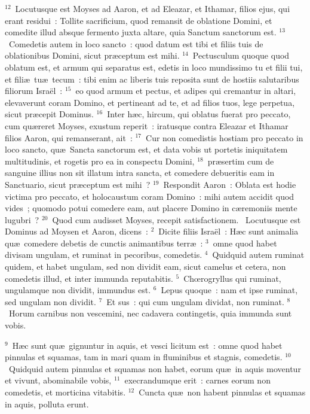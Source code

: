 ${}^{12}$~Locutusque est Moyses ad Aaron, et ad Eleazar, et Ithamar, filios ejus, qui erant residui~: Tollite sacrificium, quod remansit de oblatione Domini, et comedite illud absque fermento juxta altare, quia Sanctum sanctorum est.
${}^{13}$~Comedetis autem in loco sancto~: quod datum est tibi et filiis tuis de oblationibus Domini, sicut pr\ae ceptum est mihi.
${}^{14}$~Pectusculum quoque quod oblatum est, et armum qui separatus est, edetis in loco mundissimo tu et filii tui, et fili\ae\ tu\ae\ tecum~: tibi enim ac liberis tuis reposita sunt de hostiis salutaribus filiorum Isra\"el~:
${}^{15}$~eo quod armum et pectus, et adipes qui cremantur in altari, elevaverunt coram Domino, et pertineant ad te, et ad filios tuos, lege perpetua, sicut pr\ae cepit Dominus.
${}^{16}$~Inter h\ae c, hircum, qui oblatus fuerat pro peccato, cum qu\ae reret Moyses, exustum reperit~: iratusque contra Eleazar et Ithamar filios Aaron, qui remanserant, ait~:
${}^{17}$~Cur non comedistis hostiam pro peccato in loco sancto, qu\ae\ Sancta sanctorum est, et data vobis ut portetis iniquitatem multitudinis, et rogetis pro ea in conspectu Domini,
${}^{18}$~pr\ae sertim cum de sanguine illius non sit illatum intra sancta, et comedere debueritis eam in Sanctuario, sicut pr\ae ceptum est mihi~?
${}^{19}$~Respondit Aaron~: Oblata est hodie victima pro peccato, et holocaustum coram Domino~: mihi autem accidit quod vides~; quomodo potui comedere eam, aut placere Domino in c\ae remoniis mente lugubri~?
${}^{20}$~Quod cum audisset Moyses, recepit satisfactionem.
~Locutusque est Dominus ad Moysen et Aaron, dicens~:
${}^{2}$~Dicite filiis Isra\"el~: H\ae c sunt animalia qu\ae\ comedere debetis de cunctis animantibus terr\ae~:
${}^{3}$~omne quod habet divisam ungulam, et ruminat in pecoribus, comedetis.
${}^{4}$~Quidquid autem ruminat quidem, et habet ungulam, sed non dividit eam, sicut camelus et cetera, non comedetis illud, et inter immunda reputabitis.
${}^{5}$~Chœrogryllus qui ruminat, ungulamque non dividit, immundus est.
${}^{6}$~Lepus quoque~: nam et ipse ruminat, sed ungulam non dividit.
${}^{7}$~Et sus~: qui cum ungulam dividat, non ruminat.
${}^{8}$~Horum carnibus non vescemini, nec cadavera contingetis, quia immunda sunt vobis.


${}^{9}$~H\ae c sunt qu\ae\ gignuntur in aquis, et vesci licitum est~: omne quod habet pinnulas et squamas, tam in mari quam in fluminibus et stagnis, comedetis.
${}^{10}$~Quidquid autem pinnulas et squamas non habet, eorum qu\ae\ in aquis moventur et vivunt, abominabile vobis,
${}^{11}$~execrandumque erit~: carnes eorum non comedetis, et morticina vitabitis.
${}^{12}$~Cuncta qu\ae\ non habent pinnulas et squamas in aquis, polluta erunt.


